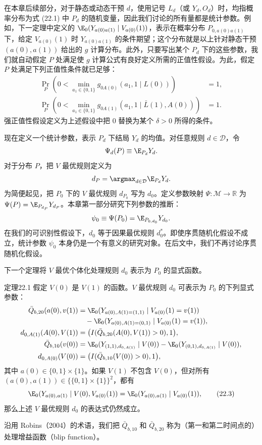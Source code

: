 在本章后续部分，对于静态或动态干预 $d$，使用记号 $L_d$（或 $Y_d,O_d$）时，均指概率分布为式 (22.1) 中 $P_d$ 的随机变量，因此我们讨论的所有量都是统计参数。例如，下一定理中定义的 $\E_0(Y_{a(0)a(1)}\mid V_{a(0)}(1))$，表示在概率分布 $P_{0,a(0)a(1)}$ 下，给定 $V_{a(0)}(1)$ 时 $Y_{a(0)a(1)}$ 的条件期望；这个分布就是以上针对静态干预 $(a(0),a(1))$ 给出的 $g$ 计算分布。此外，只要写出某个 $P_d$ 下的这些参数，我们就自动假定 $P$ 处满足使 $g$ 计算公式有良好定义所需的正值性假设。为此，假定 $P$ 处满足下列正值性条件就已足够：
\begin{equation}
\begin{aligned}
 \Pr_P\left(0<\min_{a_1\in\{0,1\}}g_{0A(0)}(a_1,1\mid L(0))\right)&=1,\\
 \Pr_P\left(0<\min_{a_1\in\{0,1\}}g_{0A(1)}(a_1,1\mid\bar L(1),A(0))\right)&=1.
\end{aligned}
\tag{22.2}
\end{equation}
强正值性假设定义为上述假设中把 0 替换为某个 $\delta>0$ 所得的条件。

现在定义一个统计参数，表示 $P_d$ 下结局 $Y_d$ 的均值。对任意规则 $d\in\mathcal D$，令
\[
 \Psi_d(P)\equiv\E_{P_d}Y_d.
\]
对于分布 $P$，把 $V$ 最优规则定义为
\[
 d_P=\argmax_{d\in\mathcal D}\E_{P_d}Y_d.
\]
为简便起见，把 $P_0$ 下的 $V$ 最优规则 $d_{P_0}$ 写为 $d_0$。定义参数映射 $\Psi:\mathcal M\to\mathbb R$ 为 $\Psi(P)=\E_{P_{d_P}}Y_{d_P}$。本章第一部分研究下列参数的推断：
\[
 \psi_0\equiv\Psi(P_0)=\E_{P_{0,d_0}}Y_{d_0}.
\]
在我们的可识别性假设下，$d_0$ 等于因果最优规则 $d_0^*$。即使序贯随机化假设不成立，统计参数 $\psi_0$ 本身仍是一个有意义的研究对象。在后文中，我们不再讨论序贯随机化假设。

下一个定理将 $V$ 最优个体化处理规则 $d_0$ 表示为 $P_0$ 的显式函数。

\begin{bookresult}{定理}{22.1}
假定 $V(0)$ 是 $V(1)$ 的函数。$V$ 最优规则 $d_0$ 可表示为 $P_0$ 的下列显式参数：
\[
\begin{aligned}
 \bar Q_{b,20}(a(0),v(1))
 &=\E_0(Y_{a(0),A(1)=(1,1)}\mid V_{a(0)}(1)=v(1))\\
 &\quad-\E_0(Y_{a(0),A(1)=(0,1)}\mid V_{a(0)}(1)=v(1)),\\
 d_{0,A(1)}(A(0),V(1))
 &=\bigl(I(\bar Q_{b,20}(A(0),V(1))>0),1\bigr),\\
 \bar Q_{b,10}(v(0))
 &=\E_0(Y_{(1,1),d_{0,A(1)}}\mid V(0))
 -\E_0(Y_{(0,1),d_{0,A(1)}}\mid V(0)),\\
 d_{0,A(0)}(V(0))
 &=\bigl(I(\bar Q_{b,10}(V(0))>0),1\bigr),
\end{aligned}
\]
其中 $a(0)\in\{0,1\}\times\{1\}$。如果 $V(1)$ 不包含 $V(0)$，但对所有
$(a(0),a(1))\in\{\{0,1\}\times\{1\}\}^2$，都有
\begin{equation}
 \E_0(Y_{a(0),a(1)}\mid V(0),V_{a(0)}(1))
 =\E_0(Y_{a(0),a(1)}\mid V_{a(0)}(1)),
\tag{22.3}
\end{equation}
那么上述 $V$ 最优规则 $d_0$ 的表达式仍然成立。
\end{bookresult}

沿用 Robins（2004）的术语，我们把 $\bar Q_{b,10}$ 和 $\bar Q_{b,20}$ 称为（第一和第二时间点的）处理增益函数（blip function）。
